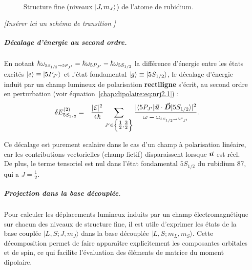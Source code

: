 \begin{figure}[!htb]
\begin{tikzpicture}
\end{tikzpicture}
\caption{Structure fine (niveaux $\ket{J, m_J}$) de l’atome de rubidium.}

\end{figure}
\vspace{1em}
\begin{center}
\textit{[Insérer ici un schéma de transition ]}
\end{center}

\subparagraph{Décalage d’énergie au second ordre.}

En notant $\hbar\omega_{\scriptscriptstyle \tiny 5S_{1/2} \rightarrow 5P_{J'}} = \hbar\omega_{5P_{J'}} - \hbar\omega_{5S_{1/2}}$ la différence d’énergie entre les états excités $\ket{e} \equiv \ket{5P_{J'}}$ et l’état fondamental $\ket{g} \equiv \ket{5S_{1/2}}$, le décalage d’énergie induit par un champ lumineux de polarisation \textbf{rectiligne} s’écrit, au second ordre en perturbation (voir équation~\eqref{chap:dipolaire:eq:nrj2.1}) :
\begin{eqnarray}
	\delta E_{5S_{1/2}}^{(2)} & = & \frac{|\mathcal{E}|^2}{4\hbar} \sum_{J' \in \left\{ \tfrac{1}{2}, \tfrac{3}{2} \right\}} 
		\frac{|\langle 5P_{J'}|\operatorvec{u} \cdot \operatorvec{D}|5S_{1/2}\rangle|^2}{\omega - \omega_{\scriptscriptstyle  \tiny 5S_{1/2} \rightarrow 5P_{J'}}}.
	\label{chap:dipolaire:eq:nrj2.3}
\end{eqnarray}

Ce décalage est purement scalaire dans le cas d’un champ à polarisation linéaire, car les contributions vectorielles (champ fictif) disparaissent lorsque $\operatorvec{u}$ est réel. De plus, le terme tensoriel est nul dans l’état fondamental $5S_{1/2}$ du rubidium 87, qui a $J = \tfrac{1}{2}$.




\subparagraph{Projection dans la base découplée.}

Pour calculer les déplacements lumineux induits par un champ électromagnétique sur chacun des niveaux de structure fine, il est utile d'exprimer les états de la base couplée $|L, S; J, m_J\rangle$ dans la base découplée $|L, S; m_L, m_S\rangle$. Cette décomposition permet de faire apparaître explicitement les composantes orbitales et de spin, ce qui facilite l’évaluation des éléments de matrice du moment dipolaire.

